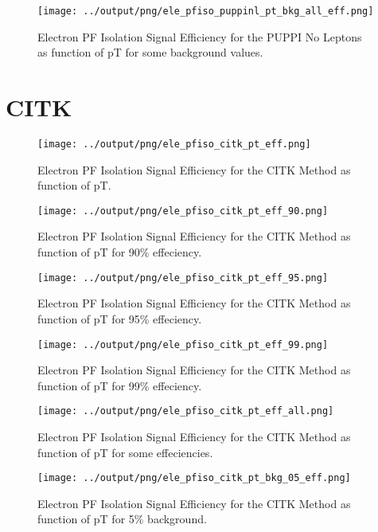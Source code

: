 \documentclass[11pt]{book}
\begin{document}
\begin{figure}[htb]
\centering
\texttt{[image: ../output/png/ele\_pfiso\_puppinl\_pt\_bkg\_all\_eff.png]}
\caption{Electron PF Isolation Signal Efficiency for the PUPPI No Leptons as function of pT for some background values.}
\label{fig:ele_pfiso_pt_bkg_puppinl_bkg_all_eff}
\end{figure}
\clearpage

\section{CITK}
\begin{figure}[htb]
\centering
\texttt{[image: ../output/png/ele\_pfiso\_citk\_pt\_eff.png]}
\caption{Electron PF Isolation Signal Efficiency for the CITK Method as function of pT.}
\label{fig:ele_pfiso_pt_eff_citk}
\end{figure}

\begin{figure}[htb]
\centering
\texttt{[image: ../output/png/ele\_pfiso\_citk\_pt\_eff\_90.png]}
\caption{Electron PF Isolation Signal Efficiency for the CITK Method as function of pT for 90\% effeciency.}
\label{fig:ele_pfiso_pt_eff_citk_eff_90}
\end{figure}

\begin{figure}[htb]
\centering
\texttt{[image: ../output/png/ele\_pfiso\_citk\_pt\_eff\_95.png]}
\caption{Electron PF Isolation Signal Efficiency for the CITK Method as function of pT for 95\% effeciency.}
\label{fig:ele_pfiso_pt_eff_citk_eff_95}
\end{figure}

\begin{figure}[htb]
\centering
\texttt{[image: ../output/png/ele\_pfiso\_citk\_pt\_eff\_99.png]}
\caption{Electron PF Isolation Signal Efficiency for the CITK Method as function of pT for 99\% effeciency.}
\label{fig:ele_pfiso_pt_eff_citk_eff_99}
\end{figure}

\begin{figure}[htb]
\centering
\texttt{[image: ../output/png/ele\_pfiso\_citk\_pt\_eff\_all.png]}
\caption{Electron PF Isolation Signal Efficiency for the CITK Method as function of pT for some effeciencies.}
\label{fig:ele_pfiso_pt_eff_citk_eff_all}
\end{figure}

\begin{figure}[htb]
\centering
\texttt{[image: ../output/png/ele\_pfiso\_citk\_pt\_bkg\_05\_eff.png]}
\caption{Electron PF Isolation Signal Efficiency for the CITK Method as function of pT for 5\% background.}
\label{fig:ele_pfiso_pt_bkg_citk_bkg_05_eff}
\end{figure}
\end{document}
